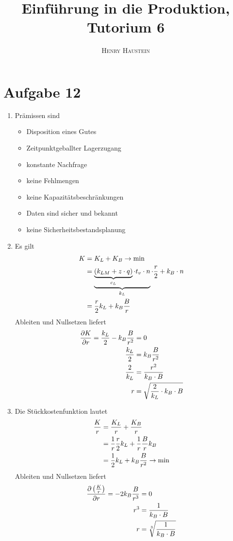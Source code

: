 \documentclass{article}
\title{\textbf{Einführung in die Produktion, Tutorium 6}}
\author{\textsc{Henry Haustein}}
\date{}
\begin{document}
	\maketitle
	
	\section*{Aufgabe 12}
	\begin{enumerate}[label=(\alph*)]
		\item Prämissen sind
		\begin{itemize}
			\item Disposition eines Gutes
			\item Zeitpunktgeballter Lagerzugang
			\item konstante Nachfrage
			\item keine Fehlmengen
			\item keine Kapazitätsbeschränkungen
			\item Daten sind sicher und bekannt
			\item keine Sicherheitsbestandsplanung
		\end{itemize}
		\item Es gilt
		\begin{align}
			K &= K_L + K_B \to\min \notag \\
			&= \underbrace{\underbrace{(k_{LM} + z\cdot q)}_{c_L} \cdot t_v\cdot n}_{k_L} \cdot\frac{r}{2}  + k_B\cdot n \notag \\
			&= \frac{r}{2}k_L + k_B\frac{B}{r} \notag
		\end{align}
		Ableiten und Nullsetzen liefert
		\begin{align}
			\frac{\partial K}{\partial r} = \frac{k_L}{2} - k_B\frac{B}{r^2} &= 0 \notag \\
			\frac{k_L}{2} &= k_B\frac{B}{r^2} \notag \\
			\frac{2}{k_L} &= \frac{r^2}{k_B\cdot B} \notag \\
			r &= \sqrt{\frac{2}{k_L}\cdot k_B\cdot B} \notag
		\end{align}
		\item Die Stückkostenfunktion lautet
		\begin{align}
			\frac{K}{r} &= \frac{K_L}{r} + \frac{K_B}{r} \notag \\
			&= \frac{1}{r}\frac{r}{2}k_L + \frac{1}{r}\frac{B}{r}k_B \notag \\
			&= \frac{1}{2}k_L + k_B\frac{B}{r^2} \to\min \notag
		\end{align}
		Ableiten und Nullsetzen liefert
		\begin{align}
			\frac{\partial\left(\frac{K}{r}\right)}{\partial r} = -2 k_B\frac{B}{r^3} &= 0 \notag \\
			r^3 &= \frac{1}{k_B\cdot B} \notag \\
			r &= \sqrt[3]{\frac{1}{k_B\cdot B}} \notag
		\end{align}
	\end{enumerate}
\end{document}
